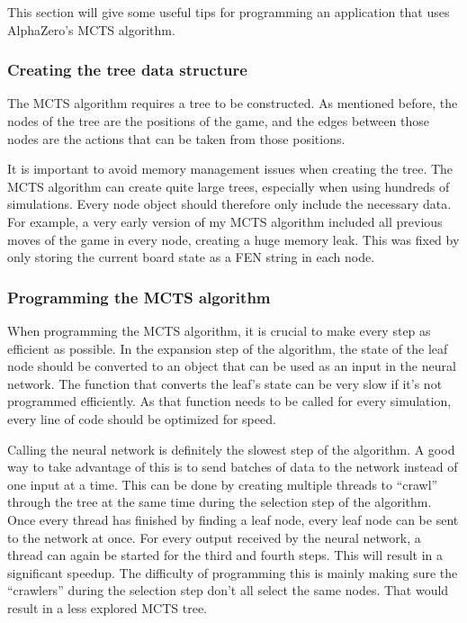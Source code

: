 \documentclass{article}
\begin{document}
This section will give some useful tips for programming an application that uses
AlphaZero's MCTS algorithm. 

\subsubsection{Creating the tree data structure}

The MCTS algorithm requires a tree to be constructed. As mentioned before, the nodes of the tree
are the positions of the game, and the edges between those nodes are the actions that can be taken
from those positions. 

It is important to avoid memory management issues when creating the tree. The MCTS algorithm 
can create quite large trees, especially when using hundreds of simulations. Every node object
should therefore only include the necessary data. For example, a very early version of my MCTS algorithm 
included all previous moves of the game in every node, creating a huge memory leak. This was fixed
by only storing the current board state as a FEN string in each node.

\subsubsection{Programming the MCTS algorithm}

When programming the MCTS algorithm, it is crucial to make every step as efficient as possible.
In the expansion step of the algorithm, the state of the leaf node should be converted to an object
that can be used as an input in the neural network. The function that converts the leaf's state 
can be very slow if it's not programmed efficiently. As that function needs to be called for every
simulation, every line of code should be optimized for speed.

Calling the neural network is definitely the slowest step of the algorithm. A good way to take 
advantage of this is to send batches of data to the network instead of one input at a time. 
This can be done by creating multiple threads to ``crawl'' through the tree at the same time 
during the selection step of the algorithm. 
Once every thread has finished by finding a leaf node, every leaf node can be sent to the network at once. 
For every output received by the neural network, a thread can again be started for the third and fourth steps. 
This will result in a significant speedup. 
The difficulty of programming this is mainly making sure the ``crawlers'' during the selection step
don't all select the same nodes. That would result in a less explored MCTS tree.
\end{document}
